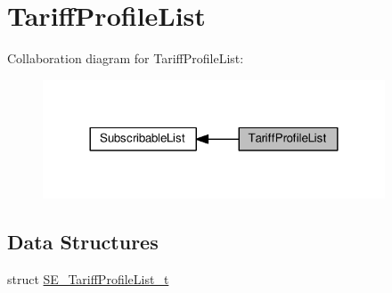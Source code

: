 \hypertarget{group__TariffProfileList}{}\section{Tariff\+Profile\+List}
\label{group__TariffProfileList}
Collaboration diagram for Tariff\+Profile\+List\+:\nopagebreak
\begin{figure}[H]
\begin{center}
\leavevmode
\includegraphics[width=288pt]{group__TariffProfileList}
\end{center}
\end{figure}
\subsection*{Data Structures}
\begin{DoxyCompactItemize}
\item 
struct \hyperlink{structSE__TariffProfileList__t}{S\+E\+\_\+\+Tariff\+Profile\+List\+\_\+t}
\end{DoxyCompactItemize}

